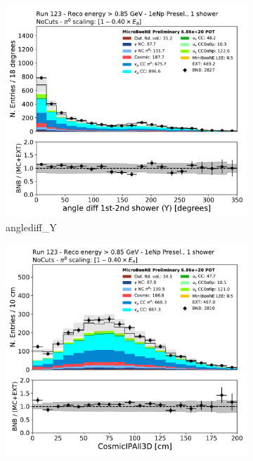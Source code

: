 \begin{figure}[H]
    \centering
    \begin{subfigure}{0.3\textwidth}
    \includegraphics[width=1.0\textwidth]{Sidebands/Figures/1eNp/HighEnergy/HiEext_NPOneShr_None_pi0e040/anglediff_Y.pdf}
    \caption{anglediff\_Y}
    \end{subfigure}
    \begin{subfigure}{0.3\textwidth}
    \includegraphics[width=1.0\textwidth]{Sidebands/Figures/1eNp/HighEnergy/HiEext_NPOneShr_None_pi0e040/CosmicIPAll3D.pdf}

\end{subfigure}
\end{figure}
